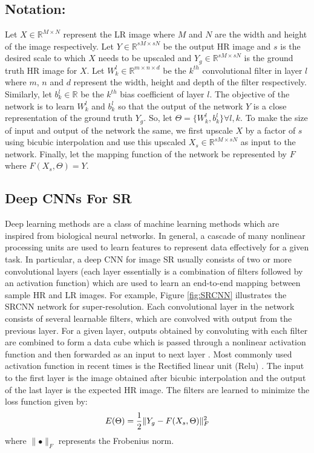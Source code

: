 \documentclass{article}
\def\sqz{\vspace{-3pt}}
\begin{document}
\subsection{Notation:}
Let $X \in \mathbb{R}^{M\times N}$ represent the LR image where $M$ and $N$ are the width and height of the image respectively. Let $Y\in \mathbb{R}^{sM\times sN}$ be the output HR image and $s$ is the desired scale to which $X$ needs to be upscaled and $Y_{g} \in \mathbb{R}^{sM\times sN}$ is the ground truth HR image for $X$. Let $W_{k}^{l} \in \mathbb{R}^{m\times n\times d}$ be the $k^{th}$ convolutional filter in layer $l$ where $m$, $n$ and $d$ represent the width, height and depth of the filter respectively. Similarly, let $b_{k}^{l} \in \mathbb{R}$ be the $k^{th}$ bias coefficient of layer $l$. The objective of the network is to learn $W_{k}^{l}$ and $b_{k}^{l}$ so that the output of the network $Y$ is a close representation of the ground truth $Y_{g}$. So, let $\Theta = \{W_{k}^{l}, b_{k}^{l}\} \forall l,k$. To make the size of input and output of the network the same, we first upscale $X$ by a factor of $s$ using bicubic interpolation and use this upscaled $X_{s}\in \mathbb{R}^{sM\times sN}$ as input to the network. Finally, let the mapping function of the network be represented by $F$ where $F(X_{s}, \Theta) = Y$.

\subsection{Deep CNNs For SR}
Deep learning methods are a class of machine learning methods which are inspired from biological neural networks. In general, a cascade of many nonlinear processing units are used to learn features to represent data effectively for a  given task. In particular, a deep CNN for image SR usually consists of two or more convolutional layers (each layer essentially is a combination of filters followed by an activation function) which are used to learn an end-to-end  mapping between sample HR and LR images. For example, Figure \ref{fig:SRCNN} illustrates the SRCNN network \cite{dong2016image, yang2016super} for super-resolution. Each convolutional layer in the network consists of several learnable filters, which are convolved with output from the previous layer. For a given layer, outputs obtained by convoluting with each filter are combined to form a data cube which is passed through a nonlinear activation function and then forwarded as an input to next layer \cite{lecun2015deep}. Most commonly used activation function in recent times is the Rectified linear unit (Relu) \cite{glorot2011deep}. The input to the first layer is the image obtained after bicubic interpolation and the output of the last layer is the expected HR image. The filters are learned to minimize the loss function given by:\sqz\sqz\sqz
\begin{equation}\label{eq1}
E(\Theta) = \frac{1}{2}\|Y_{g} - F(X_{s}, \Theta)\|_{F}^{2}\sqz\sqz\sqz
\end{equation}
where $\parallel\bullet\|_{F}$ represents the Frobenius norm.
\sqz\sqz
\end{document}
